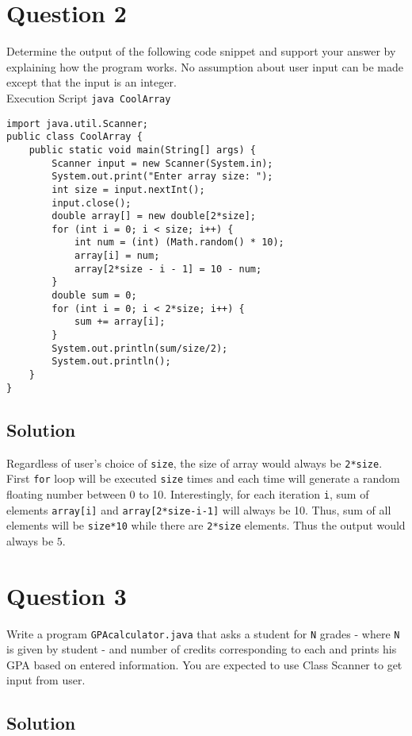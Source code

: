 \section*{Question 2}
Determine the output of the following code snippet and support your answer by explaining how the program works. No assumption about user input can be made except that the input is an integer.\\[10pt]

Execution Script \hfill \texttt{java CoolArray}

\begin{lstlisting}
import java.util.Scanner;
public class CoolArray {
	public static void main(String[] args) {
		Scanner input = new Scanner(System.in);
		System.out.print("Enter array size: ");
		int size = input.nextInt();
		input.close();
		double array[] = new double[2*size];
		for (int i = 0; i < size; i++) {
			int num = (int) (Math.random() * 10);
			array[i] = num;
			array[2*size - i - 1] = 10 - num;
		}
		double sum = 0;
		for (int i = 0; i < 2*size; i++) {
			sum += array[i];
		}
		System.out.println(sum/size/2);
		System.out.println();
	}
}

\end{lstlisting}

\subsection*{Solution}

Regardless of user's choice of \texttt{size}, the size of array would always be \texttt{2*size}. First \texttt{for} loop will be executed \texttt{size} times and each time will generate a random floating number between 0 to 10. Interestingly, for each iteration \texttt{i}, sum of elements \texttt{array[i]} and \texttt{array[2*size-i-1]} will always be 10. Thus, sum of all elements will be \texttt{size*10} while there are \texttt{2*size} elements. Thus the output would always be $5$.

\section*{Question 3}
Write a program \texttt{GPAcalculator.java} that asks a student for \texttt{N} grades - where \texttt{N} is given by student - and number of credits corresponding to each and prints his GPA based on entered information. You are expected to use Class Scanner to get input from user.

\subsection*{Solution}


